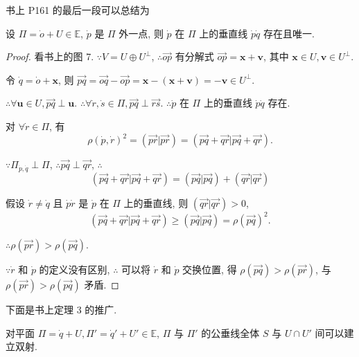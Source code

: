\documentclass[color=black,device=normal,lang=cn,mode=geye]{elegantnote}
\begin{document}
书上 P161 的最后一段可以总结为
\begin{theorem}
    设 $\varPi=\dot{o}+U\in\mathbb{E}$, $\dot{p}$ 是 $\varPi$ 外一点, 则 $\dot{p}$ 在 $\varPi$ 上的垂直线 $\dot{p}\dot{q}$ 存在且唯一.
\end{theorem}
\begin{proof}
    看书上的图 7. $\because V=U\oplus U^\perp$, $\therefore\overrightarrow{op}$ 有分解式 $\overrightarrow{op}=\boldsymbol{x}+\boldsymbol{v}$, 其中 $\boldsymbol{x}\in U,\boldsymbol{v}\in U^\perp$.

    令 $\dot{q}=\dot{o}+\boldsymbol{x}$, 则 $\overrightarrow{pq}=\overrightarrow{oq}-\overrightarrow{op}=\boldsymbol{x}-(\boldsymbol{x}+\boldsymbol{v})=-\boldsymbol{v}\in U^\perp$.

    $\therefore\forall\boldsymbol{u}\in U,\overrightarrow{pq}\perp\boldsymbol{u}$. $\therefore\forall\dot{r},\dot{s}\in\varPi,\overrightarrow{pq}\perp\overrightarrow{rs}$. $\therefore\dot{p}$ 在 $\varPi$ 上的垂直线 $\dot{p}\dot{q}$ 存在.

    对 $\forall\dot{r}\in\varPi$, 有
    \[\rho(\dot{p},\dot{r})^2=(\overrightarrow{pr}|\overrightarrow{pr})=(\overrightarrow{pq}+\overrightarrow{qr}|\overrightarrow{pq}+\overrightarrow{qr}).\]

    $\because\varPi_{\dot{p},\dot{q}}\perp\varPi$, $\therefore\overrightarrow{pq}\perp\overrightarrow{qr}$, $\therefore$
    \[(\overrightarrow{pq}+\overrightarrow{qr}|\overrightarrow{pq}+\overrightarrow{qr})=(\overrightarrow{pq}|\overrightarrow{pq})+(\overrightarrow{qr}|\overrightarrow{qr})\]
    
    假设 $\dot{r}\neq\dot{q}$ 且 $\dot{p}\dot{r}$ 是 $\dot{p}$ 在 $\varPi$ 上的垂直线, 则 $(\overrightarrow{qr}|\overrightarrow{qr})>0$,
    \[(\overrightarrow{pq}+\overrightarrow{qr}|\overrightarrow{pq}+\overrightarrow{qr})\geq(\overrightarrow{pq}|\overrightarrow{pq})=\rho(\overrightarrow{pq})^2.\]

    $\therefore\rho(\overrightarrow{pr})>\rho(\overrightarrow{pq})$.

    $\because\dot{r}$ 和 $\dot{p}$ 的定义没有区别, $\therefore$ 可以将 $\dot{r}$ 和 $\dot{p}$ 交换位置, 得 $\rho(\overrightarrow{pq})>\rho(\overrightarrow{pr})$, 与 $\rho(\overrightarrow{pr})>\rho(\overrightarrow{pq})$ 矛盾.
\end{proof}
下面是书上定理 3 的推广.
\begin{theorem}
    对平面 $\varPi=\dot{q}+U,\varPi'=\dot{q}'+U'\in\mathbb{E}$, $\varPi$ 与 $\varPi'$ 的公垂线全体 $S$ 与 $U\cap U'$ 间可以建立双射.
\end{theorem}
\end{document}
